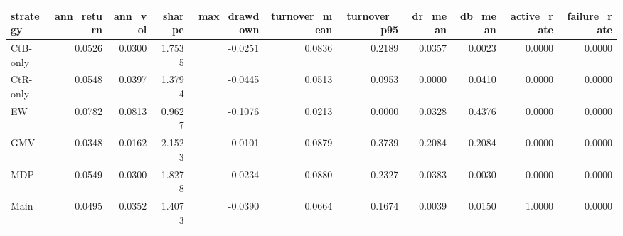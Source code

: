 \begin{tabular}{lrrrrrrrrrr}
\toprule
strategy & ann_return & ann_vol & sharpe & max_drawdown & turnover_mean & turnover_p95 & dr_mean & db_mean & active_rate & failure_rate \\
\midrule
CtB-only & 0.0526 & 0.0300 & 1.7535 & -0.0251 & 0.0836 & 0.2189 & 0.0357 & 0.0023 & 0.0000 & 0.0000 \\
CtR-only & 0.0548 & 0.0397 & 1.3794 & -0.0445 & 0.0513 & 0.0953 & 0.0000 & 0.0410 & 0.0000 & 0.0000 \\
EW & 0.0782 & 0.0813 & 0.9627 & -0.1076 & 0.0213 & 0.0000 & 0.0328 & 0.4376 & 0.0000 & 0.0000 \\
GMV & 0.0348 & 0.0162 & 2.1523 & -0.0101 & 0.0879 & 0.3739 & 0.2084 & 0.2084 & 0.0000 & 0.0000 \\
MDP & 0.0549 & 0.0300 & 1.8278 & -0.0234 & 0.0880 & 0.2327 & 0.0383 & 0.0030 & 0.0000 & 0.0000 \\
Main & 0.0495 & 0.0352 & 1.4073 & -0.0390 & 0.0664 & 0.1674 & 0.0039 & 0.0150 & 1.0000 & 0.0000 \\
\bottomrule
\end{tabular}
